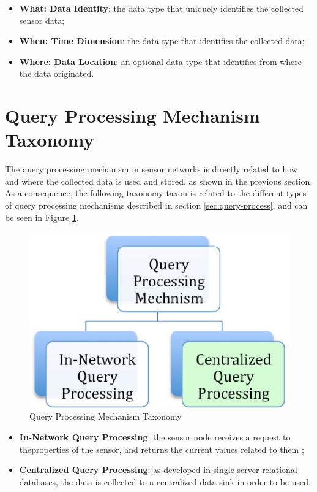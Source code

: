 \begin{itemize}
  \item \textbf{What: Data Identity}: the data type that uniquely identifies
  the collected sensor data;
  \item \textbf{When: Time Dimension}: the data type that identifies the
  collected data;
  \item \textbf{Where: Data Location}: an optional data type that identifies
  from where the data originated.
\end{itemize}

\section{Query Processing Mechanism Taxonomy}

The query processing mechanism in sensor networks is directly related to how
and where the collected data is used and stored, as shown in the previous
section. As a consequence, the following taxonomy taxon is related to the
different types of query processing mechanisms described in section
\ref{sec:query-process}, and can be seen in Figure
\ref{fig:taxonomy-query-mechanism}.

\begin{figure}[h]
  \centering
  \includegraphics{../diagrams/taxonomy-query-mechanism}
  \caption{Query Processing Mechanism Taxonomy}
  \label{fig:taxonomy-query-mechanism}
\end{figure}

\begin{itemize}
  \item \textbf{In-Network Query Processing}: the sensor node receives a
  request to theproperties of the sensor, and returns the current values
  related to them \cite{sn-intro01};
  \item \textbf{Centralized Query Processing}: as developed in single server
  relational databases, the data is collected to a centralized data sink in
  order to be used.
\end{itemize}

